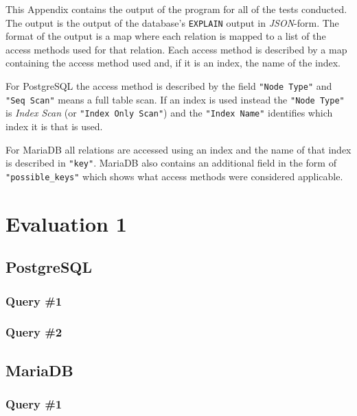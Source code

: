 This Appendix contains the output of the program for all of the tests conducted.
The output is the output of the database's \texttt{EXPLAIN} output in
\textit{JSON}-form. The format of the output is a map where each relation is
mapped to a list of the access methods used for that relation. Each access
method is described by a map containing the access method used and, if it is an
index, the name of the index.

For PostgreSQL the access method is described by the field \texttt{"Node Type"}
and \texttt{"Seq Scan"} means a full table scan. If an index is used instead the
\texttt{"Node Type"} is \emph{Index Scan} (or \texttt{"Index Only Scan"}) and the
\texttt{"Index Name"} identifies which index it is that is used.

For MariaDB all relations are accessed using an index and the name of that index
is described in \texttt{"key"}. MariaDB also contains an additional field in the form of
\texttt{"possible\_keys"} which shows what access methods were considered applicable.

\section{Evaluation 1}

\subsection{PostgreSQL}
\subsubsection{Query \#1}

\subsubsection{Query \#2}

\subsection{MariaDB}
\subsubsection{Query \#1}

